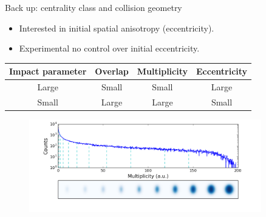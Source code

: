 \documentclass[11pt]{beamer}
\begin{document}
\begin{frame}[noframenumbering]{Back up: centrality class and collision geometry}
\begin{itemize}
\item Interested in initial spatial anisotropy (eccentricity).
\item Experimental no control over initial eccentricity.
\end{itemize}
\begin{center}
\begin{tabular}{cccc}
\hline 
Impact parameter & Overlap & Multiplicity & Eccentricity \\
\hline
Large & Small & \color{red}Small & \color{red}Large \\  
Small & Large & \color{red}Large & \color{red}Small \\ 
\hline 
\end{tabular} 
\end{center}
\begin{figure}
\begin{center}
\includegraphics[width = 0.9\textwidth]{./pics/centrality.png}
\end{center}
\end{figure}
\end{frame}
\end{document}
